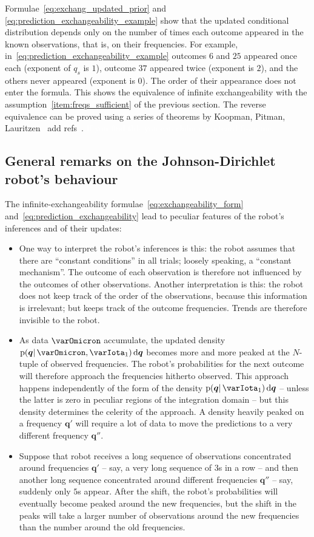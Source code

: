 \documentclass[\ifafour a4paper,12pt,\else a5paper,10pt,\fi%
onecolumn,oneside,article,%
british%
]{memoir}
\theoremstyle{remark}
\theoremstyle{innote}
\newcommand*{\di}{\mathrm{d}}%
\newcommand*{\pf}{\mathrm{p}}%
\renewcommand*{\|}{\mathpunct{|}}
\newcommand*{\puzzle}{\maltese}
\newcommand{\mynote}[1]{ {\color{notecolour}\puzzle\ #1\ }}
\newcommand*{\yqq}{q}
\newcommand*{\yq}{\bm{\yqq}}
\newcommand*{\yI}{\varIota}
\newcommand*{\yO}{\varOmicron}
\newcommand*{\yMJ}{\yI_1}
\begin{document}
Formulae~\eqref{eq:exchang_updated_prior} and
\eqref{eq:prediction_exchangeability_example} show that the updated
conditional distribution depends only on the number of times each outcome
appeared in the known observations, that is, on their frequencies. For
example, in~\eqref{eq:prediction_exchangeability_example} outcomes $6$ and
$25$ appeared once each (exponent of $\yqq_s$ is $1$), outcome $37$
appeared twice (exponent is $2$), and the others never appeared (exponent
is $0$). The order of their appearance does not enter the formula. This
shows the equivalence of infinite exchangeability with the
assumption~\ref{item:freqs_sufficient} of the previous section. The reverse
equivalence can be proved using a series of theorems by Koopman, Pitman,
Lauritzen\mynote{add refs}. \textcolor{white}{If you find this you can
  claim a postcard from me.}
%



\subsection{General remarks on the Johnson-Dirichlet robot's behaviour}
\label{sec:remarks}

The infinite-exchangeability formulae~\eqref{eq:exchangeability_form}
and~\eqref{eq:prediction_exchangeability} lead to peculiar features of the
robot's inferences and of their updates:
\begin{itemize}
\item One way to interpret the robot's inferences is this: the robot
  assumes that there are \enquote{constant conditions} in all trials;
  loosely speaking, a \enquote{constant mechanism}. The outcome of each
  observation is therefore not influenced by the outcomes of other
  observations. Another interpretation is this: the robot does not keep
  track of the order of the observations, because this information is
  irrelevant; but keeps track of the outcome frequencies. Trends are
  therefore invisible to the robot.
\item As data $\yO$ accumulate, the updated density
  $\pf(\yq \| \yO, \yMJ)\,\di\yq$ becomes more and more peaked at the
  $N$-tuple of observed frequencies. The robot's probabilities for the next
  outcome will therefore approach the frequencies hitherto observed. This
  approach happens independently of the form of the density
  $\pf(\yq \| \yMJ)\,\di\yq$ -- unless the latter is zero in peculiar
  regions of the integration domain -- but this density determines the
  celerity of the approach. A density heavily peaked on a frequency $\yq'$
  will require a lot of data to move the predictions to a very different
  frequency $\yq''$.
\item Suppose that robot receives a long sequence of observations
  concentrated around frequencies $\yq'$ -- say, a very long sequence of
  $3$s in a row -- and then another long sequence concentrated around
  different frequencies $\yq''$ -- say, suddenly only $5$s appear. After
  the shift, the robot's probabilities will eventually become peaked around
  the new frequencies, but the shift in the peaks will take a larger number
  of observations around the new frequencies than the number around the old
  frequencies.
\end{itemize}
\end{document}
